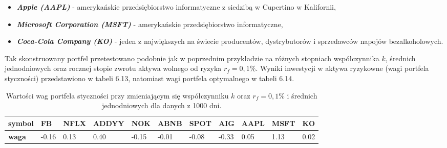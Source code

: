 \documentclass[magister]{dyplom}
\begin{document}
\begin{itemize}
	\item \textit{\textbf{Apple (AAPL)}} - amerykańskie przedsiębiorstwo informatyczne z siedzibą w Cupertino w Kalifornii,\cite{apple}
	\item \textit{\textbf{Microsoft Corporation (MSFT)}} - amerykańskie przedsiębiorstwo informatyczne,\cite{microsoft}
	\item \textit{\textbf{Coca-Cola Company (KO)}} -  jeden z największych na świecie producentów, dystrybutorów i sprzedawców napojów bezalkoholowych.\cite{coke}
\end{itemize}

Tak skonstruowany portfel przetestowano podobnie jak w poprzednim przykładzie na różnych stopniach współczynnika $k$, średnich jednodniowych oraz rocznej stopie zwrotu aktywa wolnego od ryzyka $r_f = 0,1\%$.
Wyniki inwestycji w aktywa ryzykowne (wagi portfela styczności) przedstawiono w tabeli 6.13, natomiast wagi portfela optymalnego w tabeli 6.14.

\begin{table}[ht]
	\centering
	\caption{Wartości wag portfela styczności przy zmieniającym się współczynniku $k$ oraz $r_f = 0,1\%$ i średnich jednodniowych dla danych z 1000 dni.}
	\begin{tabular}{|l|l|l|l|l|l|l|l|l|l|l|}
		\hline
		\textbf{symbol} & \textbf{FB} & \textbf{NFLX} & \textbf{ADDYY} & \textbf{NOK} & \textbf{ABNB} & \textbf{SPOT} & \textbf{AIG} & \textbf{AAPL} & \textbf{MSFT} & \textbf{KO} \\ \hline
		\textbf{waga}   & -0.16       & 0.13          & 0.40           & -0.15        & -0.01         & -0.08         & -0.33        & 0.05          & 1.13          & 0.02        \\ \hline
	\end{tabular}
\end{table}
\end{document}

